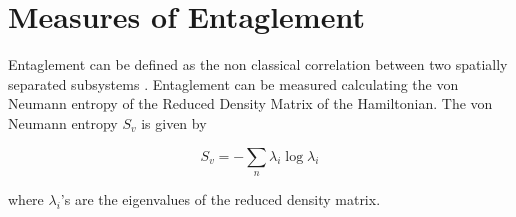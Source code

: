 \section{Measures of Entaglement}
Entaglement can be defined as the non classical correlation between two spatially separated subsystems \citep{jnbbig}. Entaglement can be measured calculating the von Neumann entropy of the Reduced Density Matrix of the Hamiltonian. The von Neumann entropy $S_v$ is given by

\begin{equation}
S_v=-\sum_{n}\lambda_i\log\lambda_i
\end{equation}

where $\lambda_i$'s are the eigenvalues of the reduced density matrix.